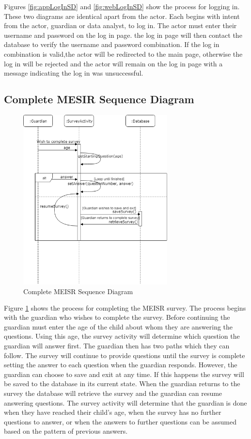 Figures  \ref{fig:appLogInSD} and \ref{fig:webLogInSD} show the process for logging in. These two diagrams are identical apart from the actor. Each begins with intent from the actor, guardian or data analyst, to log in. The actor must enter their username and password on the log in page. the log in page will then contact the database to verify the username and password combination. If the log in combination is valid,the actor will be redirected to the main page, otherwise the log in will be rejected and the actor will remain on the log in page with a message indicating the log in was unsuccessful.

\subsection{Complete MESIR Sequence Diagram}
\begin{figure}[H]
  \centering
  \includegraphics[width=0.7\textwidth]{images/CompleteMEISRSequenceDiagram.png}
  \caption{Complete MEISR Sequence Diagram}
  \label{fig:completeMEISRSD}
\end{figure}

	Figure \ref{fig:completeMEISRSD} shows the process for completing the MEISR survey. The process begins with the guardian who wishes to complete the survey. Before continuing the guardian must enter the age of the child about whom they are answering the questions. Using this age, the survey activity will determine which question the guardian will answer first. The guardian then has two paths which they can follow. The survey will continue to provide questions until the survey is complete setting the answer to each question when the guardian responds. However, the guardian can choose to save and exit at any time. If this happens the survey will be saved to the database in its current state. When the guardian returns to the survey the database will retrieve the survey and the guardian can resume answering questions. The survey activity will determine that the guardian is done when they have reached their child's age, when the survey has no further questions to answer, or when the answers to further questions can be assumed based on the pattern of previous answers. 

